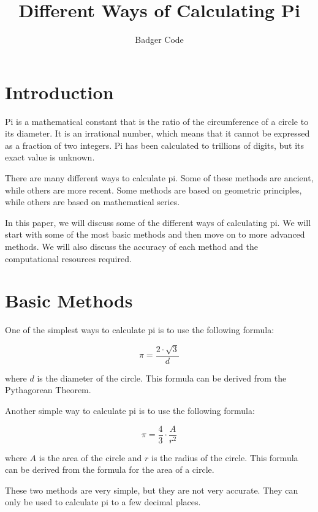 \documentclass{article}
\begin{document}
\title{Different Ways of Calculating Pi}

\author{Badger Code}

\maketitle

\section{Introduction}

Pi is a mathematical constant that is the ratio of the circumference of a circle to its diameter. It is an irrational number, which means that it cannot be expressed as a fraction of two integers. Pi has been calculated to trillions of digits, but its exact value is unknown.

There are many different ways to calculate pi. Some of these methods are ancient, while others are more recent. Some methods are based on geometric principles, while others are based on mathematical series.

In this paper, we will discuss some of the different ways of calculating pi. We will start with some of the most basic methods and then move on to more advanced methods. We will also discuss the accuracy of each method and the computational resources required.

\section{Basic Methods}

One of the simplest ways to calculate pi is to use the following formula:

\begin{equation}
\pi = \frac{2 \cdot \sqrt{3}}{d}
\end{equation}

where $d$ is the diameter of the circle. This formula can be derived from the Pythagorean Theorem.

Another simple way to calculate pi is to use the following formula:

\begin{equation}
\pi = \frac{4}{3} \cdot \frac{A}{r^2}
\end{equation}

where $A$ is the area of the circle and $r$ is the radius of the circle. This formula can be derived from the formula for the area of a circle.

These two methods are very simple, but they are not very accurate. They can only be used to calculate pi to a few decimal places.
\end{document}
